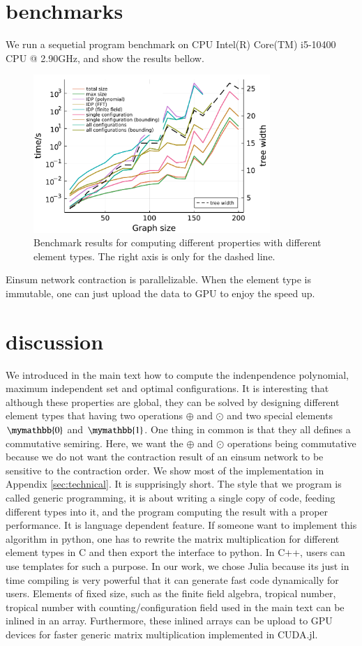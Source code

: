 \documentclass[review,onefignum,onetabnum]{siamart190516}
\newcommand{\<}{\langle}
\renewcommand{\>}{\rangle}
\begin{document}
\section{benchmarks}
We run a sequetial program benchmark on CPU Intel(R) Core(TM) i5-10400 CPU @ 2.90GHz, and show the results bellow.
\begin{figure}
    \centering
    \includegraphics[width=0.8\textwidth, trim={0cm 0cm 0cm 0cm}, clip]{benchmark.pdf}
    \caption{Benchmark results for computing different properties with different element types.
The right axis is only for the dashed line.
    }\label{fig:benchmark}
\end{figure}
Einsum network contraction is parallelizable. When the element type is immutable, one can just upload the data to GPU to enjoy the speed up.

\section{discussion}
We introduced in the main text how to compute the indenpendence polynomial, maximum independent set and optimal configurations.
It is interesting that although these properties are global,
they can be solved by designing different element types that having two operations $\oplus$ and $\odot$ and two special elements $\mymathbb{0}$ and $\mymathbb{1}$.
One thing in common is that they all defines a commutative semiring.
Here, we want the $\oplus$ and $\odot$ operations being commutative because we do not want the contraction result of an einsum network to be sensitive to the contraction order.
We show most of the implementation in Appendix \ref{sec:technical}. It is supprisingly short.
The style that we program is called generic programming,
it is about writing a single copy of code, feeding different types into it, and the program computing the result with a proper performance.
It is language dependent feature. If someone want to implement this algorithm in python,
one has to rewrite the matrix multiplication for different element types in C and then export the interface to python.
In C++, users can use templates for such a purpose.
In our work, we chose Julia because its just in time compiling is very powerful that it can generate fast code dynamically for users.
Elements of fixed size, such as the finite field algebra, tropical number, tropical number with counting/configuration field used in the main text can be inlined in an array.
Furthermore, these inlined arrays can be upload to GPU devices for faster generic matrix multiplication implemented in CUDA.jl.
\end{document}
